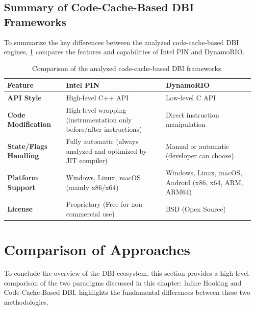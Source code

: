 \subsection{Summary of Code-Cache-Based DBI Frameworks}
To summarize the key differences between the analyzed code-cache-based \ac{DBI} engines, \cref{tab:dbi_frameworks_comparison} compares the features and capabilities of Intel PIN and DynamoRIO.

\begin{table}[H]
	\centering
	\small
	\begin{tabular}{p{3.5cm}p{4.5cm}p{5.0cm}}
		\toprule
		\textbf{Feature} & \textbf{Intel PIN} & \textbf{DynamoRIO} \\
		\midrule
		\textbf{API Style} & High-level C++ API & Low-level C API \\
		\addlinespace
		\textbf{Code Modification} & High-level wrapping (instrumentation only before/after instructions) & Direct instruction manipulation \\
		\addlinespace
		\textbf{State/Flags Handling} & Fully automatic (always analyzed and optimized by JIT compiler) & Manual or automatic (developer can choose) \\
		\addlinespace
		\textbf{Platform Support} & Windows, Linux, macOS (mainly x86/x64) & Windows, Linux, macOS, Android (x86, x64, ARM, ARM64) \\
		\addlinespace
		\textbf{License} & Proprietary (Free for non-commercial use) & BSD (Open Source) \\
		\bottomrule
	\end{tabular}
	\caption{Comparison of the analyzed code-cache-based DBI frameworks.}
	\label{tab:dbi_frameworks_comparison}
\end{table}

\section{Comparison of Approaches}
\label{sec:comparison_approaches}

To conclude the overview of the \ac{DBI} ecosystem, this section provides a high-level comparison of the two paradigms discussed in this chapter: Inline Hooking and Code-Cache-Based \ac{DBI}.  highlights the fundamental differences between these two methodologies.

